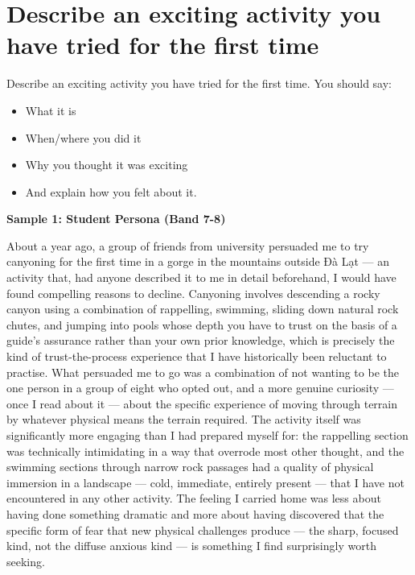 \section{Describe an exciting activity you have tried for the first time}
\begin{ieltsprompt}
Describe an exciting activity you have tried for the first time.
You should say:
\begin{itemize}[leftmargin=2em, itemsep=2pt]
\item What it is
\item When/where you did it
\item Why you thought it was exciting
\item And explain how you felt about it.
\end{itemize}
\end{ieltsprompt}
\begin{ieltsanswer}
\textbf{Sample 1: Student Persona (Band 7-8)}

About a year ago, a group of friends from university persuaded me to try canyoning for the first time in a gorge in the mountains outside Đà Lạt — an activity that, had anyone described it to me in detail beforehand, I would have found compelling reasons to decline. Canyoning involves descending a rocky canyon using a combination of rappelling, swimming, sliding down natural rock chutes, and jumping into pools whose depth you have to trust on the basis of a guide's assurance rather than your own prior knowledge, which is precisely the kind of trust-the-process experience that I have historically been reluctant to practise. What persuaded me to go was a combination of not wanting to be the one person in a group of eight who opted out, and a more genuine curiosity — once I read about it — about the specific experience of moving through terrain by whatever physical means the terrain required. The activity itself was significantly more engaging than I had prepared myself for: the rappelling section was technically intimidating in a way that overrode most other thought, and the swimming sections through narrow rock passages had a quality of physical immersion in a landscape — cold, immediate, entirely present — that I have not encountered in any other activity. The feeling I carried home was less about having done something dramatic and more about having discovered that the specific form of fear that new physical challenges produce — the sharp, focused kind, not the diffuse anxious kind — is something I find surprisingly worth seeking.


\end{ieltsanswer}
